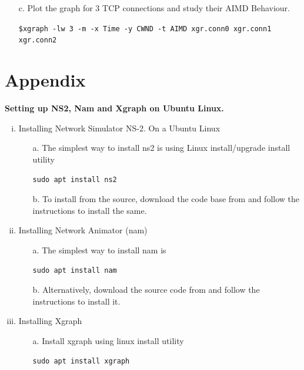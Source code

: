 \begin{multicols}{2}
\begin{itemize}
\item[c.] Plot the graph for 3 TCP connections and study their AIMD Behaviour.

\texttt{\$xgraph -lw 3 -m -x Time -y CWND -t AIMD xgr.conn0 xgr.conn1 xgr.conn2}

\end{itemize}

\section*{Appendix}

\noindent
\textbf{Setting up NS2, Nam and Xgraph on Ubuntu Linux.}

\begin{enumerate}[i.]

\item Installing Network Simulator NS-2. On a Ubuntu Linux

  \begin{itemize}
   \item[a.] The simplest way to install ns2 is using Linux install/upgrade install utility
   
   \texttt{sudo apt install ns2}

  \item[b.] To install from the source, download the code base from \cite{art2-key09} and follow the instructions to install the same.
  \end{itemize}

\item Installing Network Animator (nam)
      
      \begin{itemize}
   \item[a.] The simplest way to install nam is
   
   \texttt{sudo apt install nam}
   
   \item[b.] Alternatively, download the source code from \cite{art2-key10} and follow the instructions to install it.
   
   \end{itemize}

\item Installing Xgraph

\begin{itemize}
   \item[a.] Install xgraph \cite{art2-key11} \cite{art2-key15} using linux install utility
   
   \texttt{sudo apt install xgraph}
   

\end{itemize}
\end{enumerate}
\end{multicols}
